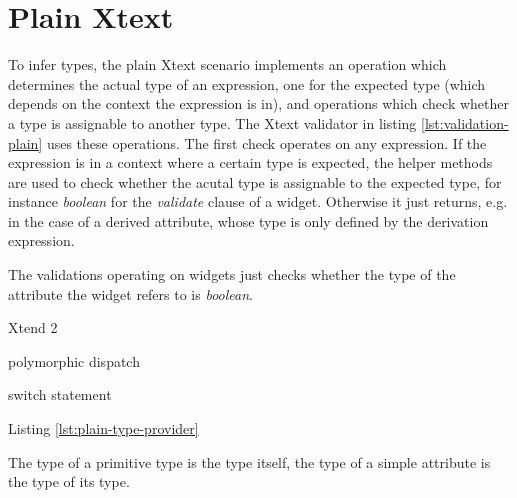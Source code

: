 \section{Plain Xtext}

To infer types, the plain Xtext scenario implements an operation which determines the actual type of an expression, one for the expected type (which depends on the context the expression is in), and operations which check whether a type is assignable to another type. The Xtext validator in listing \ref{lst:validation-plain} uses these operations. The first check operates on any expression. If the expression is in a context where a certain type is expected, the helper methods are used to check whether the acutal type is assignable to the expected type, for instance \emph{boolean} for the \emph{validate} clause of a widget. 
Otherwise it just returns, e.g. in the case of a derived attribute, whose type is only defined by the derivation expression.

The validations operating on widgets just checks whether the type of the attribute the widget refers to is \emph{boolean}.




Xtend 2 

polymorphic dispatch

switch statement

Listing \ref{lst:plain-type-provider} 

The type of a primitive type is the type itself, the type of a simple attribute is the type of its type.





